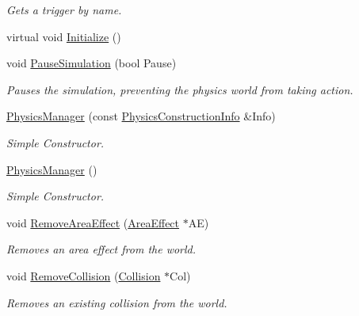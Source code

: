 \begin{DoxyCompactItemize}
\begin{DoxyCompactList}\small\item\em Gets a trigger by name. \item\end{DoxyCompactList}\item 
virtual void \hyperlink{classMezzanine_1_1PhysicsManager_ab09c912dc48b7082bd07a536167bc3d3}{Initialize} ()
\item 
void \hyperlink{classMezzanine_1_1PhysicsManager_a83b7f0be56d405ecbc51fe770e1f93b6}{PauseSimulation} (bool Pause)
\begin{DoxyCompactList}\small\item\em Pauses the simulation, preventing the physics world from taking action. \item\end{DoxyCompactList}\item 
\hyperlink{classMezzanine_1_1PhysicsManager_a0fe5d7e0c4ce3eac834478862cef73b1}{PhysicsManager} (const \hyperlink{classMezzanine_1_1PhysicsConstructionInfo}{PhysicsConstructionInfo} \&Info)
\begin{DoxyCompactList}\small\item\em Simple Constructor. \item\end{DoxyCompactList}\item 
\hyperlink{classMezzanine_1_1PhysicsManager_af734a8d307507e261995a838a0ad0dfb}{PhysicsManager} ()
\begin{DoxyCompactList}\small\item\em Simple Constructor. \item\end{DoxyCompactList}\item 
void \hyperlink{classMezzanine_1_1PhysicsManager_afb424692ede644ccef8327aae1ea9674}{RemoveAreaEffect} (\hyperlink{classMezzanine_1_1AreaEffect}{AreaEffect} $\ast$AE)
\begin{DoxyCompactList}\small\item\em Removes an area effect from the world. \item\end{DoxyCompactList}\item 
void \hyperlink{classMezzanine_1_1PhysicsManager_a7f36766f759962902d4af3b78b94e53e}{RemoveCollision} (\hyperlink{classMezzanine_1_1Collision}{Collision} $\ast$Col)
\begin{DoxyCompactList}\small\item\em Removes an existing collision from the world. \item\end{DoxyCompactList}\item 

\end{DoxyCompactItemize}
